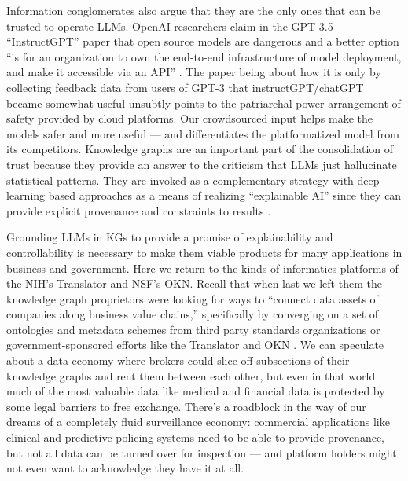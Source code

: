 \documentclass{article}
\begin{document}
Information conglomerates also argue that they are the only ones that
can be trusted to operate LLMs. OpenAI researchers claim in the GPT-3.5
``InstructGPT'' paper that open source models are dangerous and a better
option ``is for an organization to own the end-to-end infrastructure of
model deployment, and make it accessible via an API'' \cite{ouyangTrainingLanguageModels2022} . The paper being about how it is
only by collecting feedback data from users of GPT-3 that
instructGPT/chatGPT became somewhat useful unsubtly points to the
patriarchal power arrangement of safety provided by cloud platforms. Our
crowdsourced input helps make the models safer and more useful --- and
differentiates the platformatized model from its competitors. Knowledge
graphs are an important part of the consolidation of trust because they
provide an answer to the criticism that LLMs just hallucinate
statistical patterns. They are invoked as a complementary strategy with deep-learning
based approaches as a means of realizing ``explainable AI'' since they
can provide explicit provenance and constraints to results \cite{lecueRoleKnowledgeGraphs2020, janowiczNeuralsymbolicIntegrationSemantic2020, tiddiKnowledgeGraphsEXplainable2020} .

Grounding LLMs in KGs to provide a promise of explainability and
controllability is necessary to make them viable products for many
applications in business and government. Here we return to the kinds of
informatics platforms of the NIH's Translator and NSF's OKN. Recall that
when last we left them the knowledge graph proprietors were looking for
ways to ``connect data assets of companies along business value
chains,'' specifically by converging on a set of ontologies and metadata
schemes from third party standards organizations or government-sponsored
efforts like the Translator and OKN \cite{panExploitingLinkedData2017} . We can speculate about a data economy
where brokers could slice off subsections of their knowledge graphs and
rent them between each other, but even in that world much of the most
valuable data like medical and financial data is protected by some legal
barriers to free exchange. There's a roadblock in the way of our dreams
of a completely fluid surveillance economy: commercial applications like
clinical and predictive policing systems need to be able to provide
provenance, but not all data can be turned over for inspection --- and
platform holders might not even want to acknowledge they have it at all.
\end{document}
